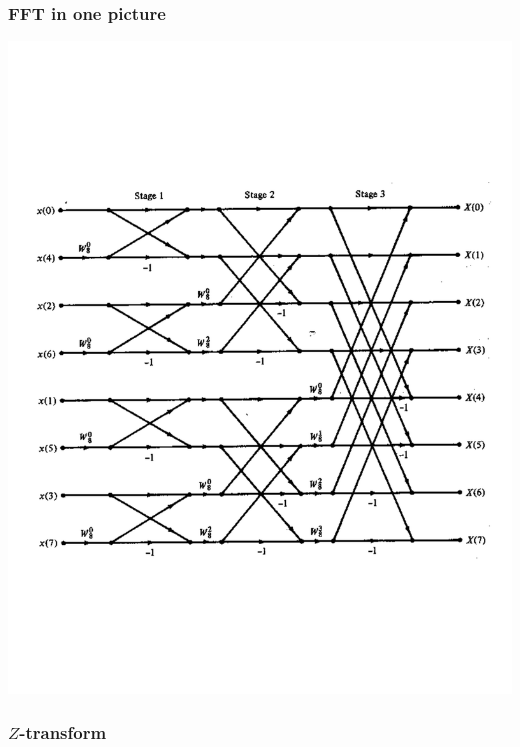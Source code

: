 \documentclass[mathserif,9pt,handout]{beamer}
\begin{document}
\begin{frame}\frametitle{FFT in one picture}\small
  \begin{center}
    \includegraphics[height=\textheight]{fft.pdf}
  \end{center}
\end{frame}


\begin{frame}\frametitle{$Z$-transform}\small
\end{frame}
\end{document}
